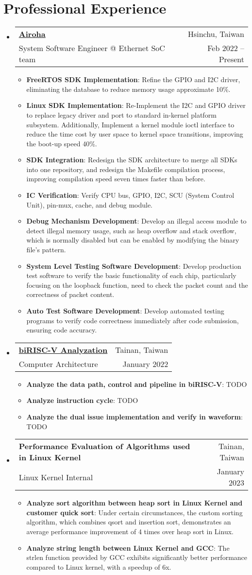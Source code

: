 \documentclass[letterpaper,11pt]{article}
\makeatletter
\newcommand{\resumeItem}[2]{
  \item\small{
    \textbf{#1}{: #2 \vspace{-2pt}}
  }
}
\newcommand{\resumeSubheading}[4]{
  \vspace{-1pt}\item
    \begin{tabular*}{0.97\textwidth}[t]{l@{\extracolsep{\fill}}r}
      \textbf{#1} & #2 \\
      \small#3 & \small #4 \\
    \end{tabular*}\vspace{-5pt}
}
\newcommand{\resumeSubHeadingListStart}{\begin{itemize}[leftmargin=*]}
\newcommand{\resumeSubHeadingListEnd}{\end{itemize}}
\newcommand{\resumeItemListStart}{\begin{itemize}}
\newcommand{\resumeItemListEnd}{\end{itemize}\vspace{-5pt}}
\makeatother
\begin{document}
\section{Professional Experience}
  \resumeSubHeadingListStart
  \resumeSubheading
      {\href{https://www.airoha.com/}{Airoha}}{Hsinchu, Taiwan}
      {System Software Engineer @ Ethernet SoC team}{Feb 2022 -- Present}
      \resumeItemListStart
        \resumeItem{FreeRTOS SDK Implementation}
          {Refine the GPIO and I2C driver, eliminating the database to reduce memory usage approximate 10\%.}
        \resumeItem{Linux SDK Implementation}
          {Re-Implement the I2C and GPIO driver to replace legacy driver and port to standard in-kernel platform subsystem. Additionally, Implement a kernel module ioctl interface to reduce the time cost by user space to kernel space transitions, improving the boot-up speed 40\%.}
        \resumeItem{SDK Integration}
          {Redesign the SDK architecture to merge all SDKs into one repository, and redesign the Makefile compilation process, improving compilation speed seven times faster than before.}
        \resumeItem{IC Verification}
          {Verify CPU bus, GPIO, I2C, SCU (System Control Unit), pin-mux, cache, and debug module.}
        \resumeItem{Debug Mechanism Development}
          {Develop an illegal access module to detect illegal memory usage, such as heap overflow and stack overflow, which is normally disabled but can be enabled by modifying the binary file's pattern.}
        \resumeItem{System Level Testing Software Development}
          {Develop production test software to verify the basic functionality of each chip, particularly focusing on the loopback function, need to check the packet count and the correctness of packet content.}
        \resumeItem{Auto Test Software Development}
          {Develop automated testing programs to verify code correctness immediately after code submission, ensuring code accuracy.}
      \resumeItemListEnd
      \resumeSubheading
      {\href{https://hackmd.io/@zoanana990/biRISC-V}{biRISC-V Analyzation}}{Tainan, Taiwan}
      {Computer Architecture}{January 2022}
      \resumeItemListStart
        \resumeItem{Analyze the data path, control and pipeline in biRISC-V}
          {TODO}
        \resumeItem{Analyze instruction cycle}
          {TODO}
        \resumeItem{Analyze the dual issue implementation and verify in waveform}
          {TODO}
      \resumeItemListEnd
            \resumeSubheading
      {Performance Evaluation of Algorithms used in Linux Kernel}{Tainan, Taiwan}
      {Linux Kernel Internal}{January 2023}
      \resumeItemListStart
        \resumeItem{Analyze sort algorithm between heap sort in Linux Kernel and customer quick sort}
          {Under certain circumstances, the custom sorting algorithm, which combines qsort and insertion sort, demonstrates an average performance improvement of 4 times over heap sort in Linux.}
        \resumeItem{Analyze string length between Linux Kernel and GCC}
          {The strlen function provided by GCC exhibits significantly better performance compared to Linux kernel, with a speedup of 6x.}
      \resumeItemListEnd
  \resumeSubHeadingListEnd
  
\end{document}
